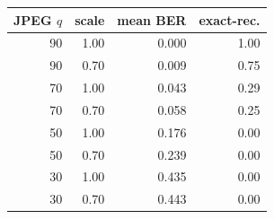 \begin{tabular}{rrrr}
\toprule
JPEG $q$ & scale & mean BER & exact-rec. \\
\midrule
90 & 1.00 & 0.000 & 1.00 \\
90 & 0.70 & 0.009 & 0.75 \\
70 & 1.00 & 0.043 & 0.29 \\
70 & 0.70 & 0.058 & 0.25 \\
50 & 1.00 & 0.176 & 0.00 \\
50 & 0.70 & 0.239 & 0.00 \\
30 & 1.00 & 0.435 & 0.00 \\
30 & 0.70 & 0.443 & 0.00 \\
\bottomrule
\end{tabular}
